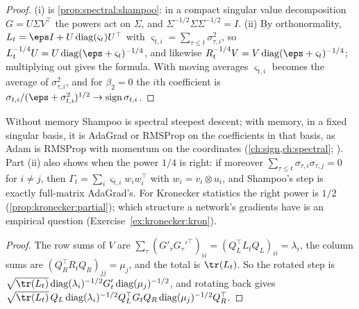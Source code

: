 \begin{refsection}
\begin{proof}
(i) is \cref{prop:spectral:shampoo}: in a compact singular value decomposition $G=U\Sigma V^\top$ the powers act on $\Sigma$, and $\Sigma^{-1/2}\Sigma\Sigma^{-1/2}=I$. (ii) By orthonormality, $L_t=\eps I+U\diag(\varsigma_t)U^\top$ with $\varsigma_{t,i}=\sum_{\tau\le t}\sigma_{\tau,i}^2$, so $L_t^{-1/4}U=U\diag(\eps+\varsigma_t)^{-1/4}$, and likewise $R_t^{-1/4}V=V\diag(\eps+\varsigma_t)^{-1/4}$; multiplying out gives the formula. With moving averages $\varsigma_{t,i}$ becomes the average of $\sigma_{\tau,i}^2$, and for $\beta_2=0$ the $i$th coefficient is $\sigma_{t,i}/(\eps+\sigma_{t,i}^2)^{1/2}\to\sign\sigma_{t,i}$.
\end{proof}

Without memory Shampoo is spectral steepest descent; with memory, in a fixed singular basis, it is AdaGrad or RMSProp on the coefficients in that basis, as Adam is RMSProp with momentum on the coordinates (\cref{ch:sign,ch:spectral}; \textcite{BernsteinNewhouse2024}). Part (ii) also shows when the power $1/4$ is right: if moreover $\sum_{\tau\le t}\sigma_{\tau,i}\sigma_{\tau,j}=0$ for $i\ne j$, then $\Gamma_t=\sum_i\varsigma_{t,i}w_iw_i^\top$ with $w_i=v_i\otimes u_i$, and Shampoo's step is exactly full-matrix AdaGrad's. For Kronecker statistics the right power is $1/2$ (\cref{prop:kronecker:partial}); which structure a network's gradients have is an empirical question (Exercise~\ref{ex:kronecker:kron}).


\begin{proof}
The row sums of $V$ are $\sum_\tau(G'_\tau G_\tau'^\top)_{ii}=(Q_L^\top L_tQ_L)_{ii}=\lambda_i$, the column sums are $(Q_R^\top R_tQ_R)_{jj}=\mu_j$, and the total is $\tr(L_t)$. So the rotated step is $\sqrt{\tr(L_t)}\diag(\lambda_i)^{-1/2}G'_t\diag(\mu_j)^{-1/2}$, and rotating back gives $\sqrt{\tr(L_t)}\,Q_L\diag(\lambda_i)^{-1/2}Q_L^\top G_tQ_R\diag(\mu_j)^{-1/2}Q_R^\top$.
\end{proof}


\end{refsection}
